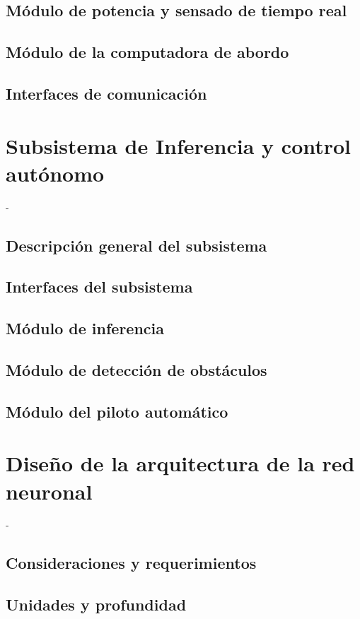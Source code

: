     \subsection{Módulo de potencia y sensado de tiempo real}

    \subsection{Módulo de la computadora de abordo}

    \subsection{Interfaces de comunicación}
    
\section{Subsistema de Inferencia y control autónomo}
-
    \subsection{Descripción general del subsistema}
    \subsection{Interfaces del subsistema}
    \subsection{Módulo de inferencia}
    \subsection{Módulo de detección de obstáculos}
    \subsection{Módulo del piloto automático}

\section{Diseño de la arquitectura de la red neuronal}
-
    \subsection{Consideraciones y requerimientos}
    \subsection{Unidades y profundidad}
